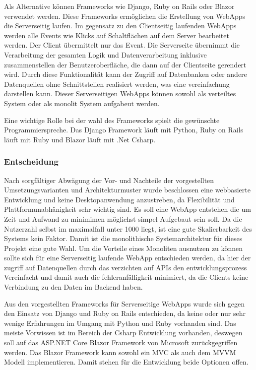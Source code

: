 Als Alternative können Frameworks wie Django, Ruby on Rails oder Blazor verwendet werden. Diese Frameworks ermöglichen die Erstellung von WebApps die Serverseitig laufen. Im gegensatz zu den Clientseitig laufenden WebApps werden alle Events wie \zB Klicks auf Schaltflächen auf dem Server bearbeitet werden. Der Client übermittelt nur das Event. Die Serverseite übernimmt die Verarbeitung der gesamten Logik und Datenverarbeitung inklusive zusammenstellen der Benutzeroberfläche, die dann auf der Clientseite gerendert wird. Durch diese Funktionalität kann der Zugriff auf Datenbanken oder andere Datenquellen ohne Schnittstellen realisiert werden, was eine vereinfachung darstellen kann. Dieser Serverseitigen WebApps können sowohl als verteiltes System oder als monolit System aufgabeut werden.

Eine wichtige Rolle bei der wahl des Frameworks spielt die gewünschte Programmierspreche. Das Django Framework läuft mit Python, Ruby on Rails läuft mit Ruby und Blazor läuft mit .Net \bzw Csharp.
\subsubsection{Entscheidung}
\label{sec:Entscheidung}
Nach sorgfältiger Abwägung der Vor- und Nachteile der vorgestellten Umsetzungsvarianten und Architekturmuster wurde beschlossen eine webbasierte Entwicklung und keine Desktopanwendung anzustreben, da Flexibilität und Plattformunabhänigkeit sehr wichtig sind. Es soll eine WebApp entstehen die um Zeit und Aufwand zu minimimen möglichst simpel Aufgebaut sein soll. Da die Nutzerzahl selbst im maximalfall unter 1000 liegt, ist eine gute Skalierbarkeit des Systems kein Faktor. Damit ist die monolithische Systemarchitektur für dieses Projekt eine gute Wahl. Um die Vorteile eines Monoliten ausnutzen zu können sollte sich für eine Serverseitig laufende WebApp entschieden werden, da hier der zugriff auf Datenquellen durch das verzichten auf APIs den entwicklungsprozess Vereinfacht und damit auch die fehleranfälligkeit minimiert, da die Clients keine Verbindung zu den Daten im Backend haben.

Aus den vorgestellten Frameworks für Serverseitige WebApps wurde sich gegen den Einsatz von Django und Ruby on Rails entschieden, da keine oder nur sehr wenige Erfahrungen im Umgang mit Python und Ruby vorhanden sind. Das meiste Vorwissen ist im Bereich der Csharp Entwicklung vorhanden, deswegen soll auf das ASP.NET Core Blazor Framework von Microsoft zurückgegriffen werden. Das Blazor Framework kann sowohl ein MVC als auch dem MVVM Modell implementieren. Damit stehen für die Entwicklung beide Optionen offen.




